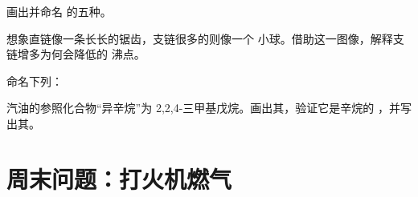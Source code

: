 \begin{exercise}[$\star\star\star$]\label{exo:g11:organic-skeletons:12}
画出并命名  的五种。
\end{exercise}

\begin{exercise}[$\star\star\star$]\label{exo:g11:organic-skeletons:13}
想象直链像一条长长的锯齿，支链很多的则像一个
小球。借助这一图像，解释支链增多为何会降低的
沸点。
\end{exercise}

\begin{exercise}[$\star\star\star$]\label{exo:g11:organic-skeletons:14}
命名下列：
\begin{center}
\end{center}
\end{exercise}

\begin{exercise}[$\star\star\star$]\label{exo:g11:organic-skeletons:15}
汽油的参照化合物“异辛烷”为
2,2,4-三甲基戊烷。画出其，验证它是辛烷的
，并写出其。
\end{exercise}

\section{周末问题：打火机燃气}

